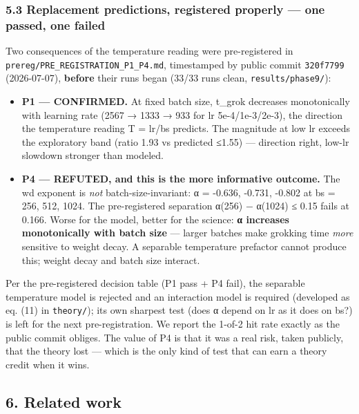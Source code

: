 \documentclass[
  11pt,
]{article}
\providecommand{\tightlist}{%
  \setlength{\itemsep}{0pt}\setlength{\parskip}{0pt}}
\begin{document}
\subsubsection{5.3 Replacement predictions, registered properly --- one
passed, one
failed}\label{replacement-predictions-registered-properly-one-passed-one-failed}

Two consequences of the temperature reading were pre-registered in
\texttt{prereg/PRE\_REGISTRATION\_P1\_P4.md}, timestamped by public
commit \texttt{320f7799} (2026-07-07), \textbf{before} their runs began
(33/33 runs clean, \texttt{results/phase9/}):

\begin{itemize}
\tightlist
\item
  \textbf{P1 --- CONFIRMED.} At fixed batch size, t\_grok decreases
  monotonically with learning rate (2567 → 1333 → 933 for lr
  5e-4/1e-3/2e-3), the direction the temperature reading T = lr/bs
  predicts. The magnitude at low lr exceeds the exploratory band (ratio
  1.93 vs predicted ≤1.55) --- direction right, low-lr slowdown stronger
  than modeled.
\item
  \textbf{P4 --- REFUTED, and this is the more informative outcome.} The
  wd exponent is \emph{not} batch-size-invariant: α = -0.636, -0.731,
  -0.802 at bs = 256, 512, 1024. The pre-registered separation
  \textbar α(256) − α(1024)\textbar{} ≤ 0.15 fails at 0.166. Worse for
  the model, better for the science: \textbf{\textbar α\textbar{}
  increases monotonically with batch size} --- larger batches make
  grokking time \emph{more} sensitive to weight decay. A separable
  temperature prefactor cannot produce this; weight decay and batch size
  interact.
\end{itemize}

Per the pre-registered decision table (P1 pass + P4 fail), the separable
temperature model is rejected and an interaction model is required
(developed as eq. (11) in \texttt{theory/}); its own sharpest test (does
α depend on lr as it does on bs?) is left for the next pre-registration.
We report the 1-of-2 hit rate exactly as the public commit obliges. The
value of P4 is that it was a real risk, taken publicly, that the theory
lost --- which is the only kind of test that can earn a theory credit
when it wins.

\subsection{6. Related work}\label{related-work}
\end{document}
